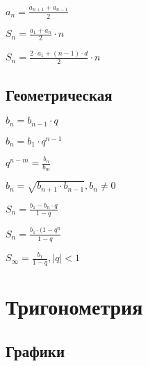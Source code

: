 $ a_n = \frac{a_{n+1} + a_{n-1}}{2} $

$ S_n = \frac{a_1 + a_n}{2}\cdot n $

$ S_n = \frac{2\cdot a_1 + (n-1)\cdot d}{2}\cdot n $

\subsection{Геометрическая}

$ b_n = b_{n-1}\cdot q $

$ b_n = b_1 \cdot q^{n-1} $

$ q^{n-m} = \frac{b_n}{b_m} $

$ b_n = \sqrt{b_{n+1}\cdot b_{n-1}}, b_n \neq 0 $

$ S_n = \frac{b_1 - b_n\cdot q}{1-q} $

$ S_n = \frac{b_1\cdot (1 - q^n}{1-q} $

$ S_\infty = \frac{b_1}{1-q}, \left|q\right| < 1 $


\section{Тригонометрия}

\subsection{Графики}

